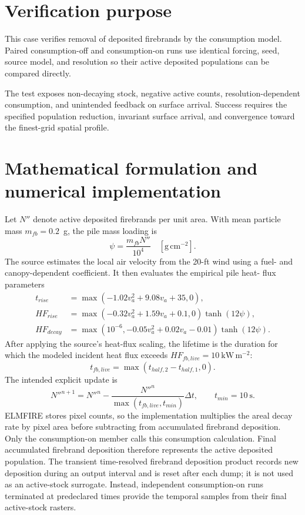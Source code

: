 \section{Verification purpose}

This case verifies removal of deposited firebrands by the consumption model. Paired consumption-off and consumption-on runs use identical forcing, seed, source model, and resolution so their active deposited populations can be compared directly.

The test exposes non-decaying stock, negative active counts, resolution-dependent consumption, and unintended feedback on surface arrival. Success requires the specified population reduction, invariant surface arrival, and convergence toward the finest-grid spatial profile.

\section{Mathematical formulation and numerical implementation}
Let \(N''\) denote active deposited firebrands per unit area. With mean particle
mass \(m_{fb}=0.2\)~g, the pile mass loading is
\begin{equation}
 \psi=\frac{m_{fb}N''}{10^4}\quad[\mathrm{g\,cm^{-2}}].
\end{equation}
The source estimates the local air velocity from the 20-ft wind using a fuel-
and canopy-dependent coefficient. It then evaluates the empirical pile heat-
flux parameters
\begin{align}
 t_{rise}&=\max(-1.02v_a^2+9.08v_a+35,0),\\
 HF_{rise}&=\max(-0.32v_a^2+1.59v_a+0.1,0)\tanh(12\psi),\\
 HF_{decay}&=\max(10^{-6},-0.05v_a^2+0.02v_a-0.01)\tanh(12\psi).
\end{align}
After applying the source's heat-flux scaling, the lifetime is the duration for
which the modeled incident heat flux exceeds
\(HF_{fb,live}=10~\mathrm{kW\,m^{-2}}\):
\begin{equation}
 t_{fb,live}=\max(t_{half,2}-t_{half,1},0).
\end{equation}
The intended explicit update is
\begin{equation}
 N''^{n+1}=N''^n-\frac{N''^n}{\max(t_{fb,live},t_{min})}\Delta t,
 \qquad t_{min}=10~\mathrm{s}.
 \label{eq:decay}
\end{equation}
ELMFIRE stores pixel counts, so the implementation multiplies the areal decay
rate by pixel area before subtracting from accumulated firebrand deposition. Only the
consumption-on member calls this consumption calculation. Final accumulated firebrand deposition therefore
represents the active deposited population. The transient
time-resolved firebrand deposition product records new deposition during an
output interval and is reset after each dump; it is not used as an active-stock
surrogate. Instead, independent consumption-on runs terminated at predeclared
times provide the temporal samples from their final active-stock rasters.

